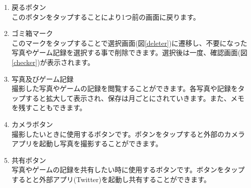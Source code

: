 \documentclass[a4j]{jarticle}
\begin{document}
\begin{enumerate}
  \renewcommand{\labelenumi}{\textcircled{\scriptsize \theenumi}}
  \item 戻るボタン\\
       このボタンをタップすることにより1つ前の画面に戻ります。
  \item ゴミ箱マーク\\
      このマークをタップすることで選択画面(図\ref{deleter})に遷移し、不要になった写真やゲーム記録を選択する事で削除できます。選択後は一度、確認画面(図\ref{checker})が表示されます。
  \item 写真及びゲーム記録\\
       撮影した写真やゲームの記録を閲覧することができます。各写真や記録をタップすると拡大して表示され、保存は月ごとにされていきます。また、メモを残すこともできます。
  \item カメラボタン\\
        撮影したいときに使用するボタンです。ボタンをタップすると外部のカメラアプリを起動し写真を撮影することができます。
  \item 共有ボタン　\label{enum:share}\\
        写真やゲームの記録を共有したい時に使用するボタンです。ボタンをタップするとと外部アプリ(Twitter)を起動し共有することができます。
\end{enumerate}
\end{document}
